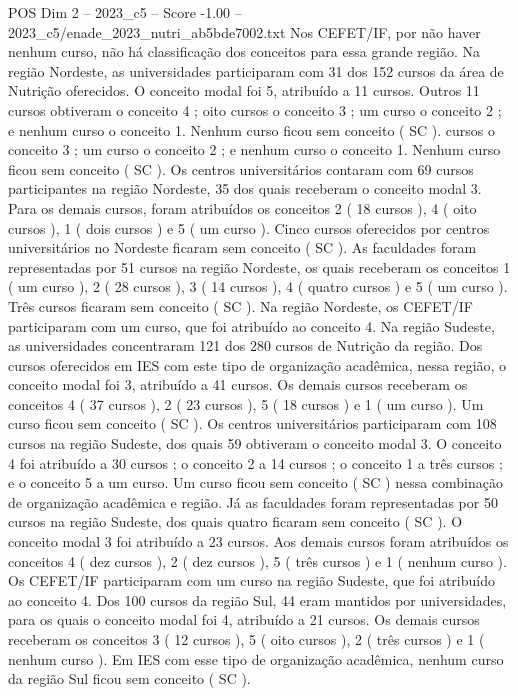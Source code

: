 \begin{textsample}{POS Dim 2 – 2023\_c5 – Score -1.00 – 2023\_c5/enade\_2023\_nutri\_ab5bde7002.txt}
Nos CEFET/IF, por não haver nenhum curso, não há classificação dos conceitos para essa grande região.
Na região Nordeste, as universidades participaram com 31 dos 152 cursos da área de Nutrição oferecidos.
O conceito modal foi 5, atribuído a 11 cursos.
Outros 11 cursos obtiveram o conceito 4 ; oito cursos o conceito 3 ; um curso o conceito 2 ; e nenhum curso o conceito 1.
Nenhum curso ficou sem conceito ( SC ). cursos o conceito 3 ; um curso o conceito 2 ; e nenhum curso o conceito 1.
Nenhum curso ficou sem conceito ( SC ).
Os centros universitários contaram com 69 cursos participantes na região Nordeste, 35 dos quais receberam o conceito modal 3.
Para os demais cursos, foram atribuídos os conceitos 2 ( 18 cursos ), 4 ( oito cursos ), 1 ( dois cursos ) e 5 ( um curso ).
Cinco cursos oferecidos por centros universitários no Nordeste ficaram sem conceito ( SC ).
As faculdades foram representadas por 51 cursos na região Nordeste, os quais receberam os conceitos 1 ( um curso ), 2 ( 28 cursos ), 3 ( 14 cursos ), 4 ( quatro cursos ) e 5 ( um curso ).
Três cursos ficaram sem conceito ( SC ).
Na região Nordeste, os CEFET/IF participaram com um curso, que foi atribuído ao conceito 4.
Na região Sudeste, as universidades concentraram 121 dos 280 cursos de Nutrição da região.
Dos cursos oferecidos em IES com este tipo de organização acadêmica, nessa região, o conceito modal foi 3, atribuído a 41 cursos.
Os demais cursos receberam os conceitos 4 ( 37 cursos ), 2 ( 23 cursos ), 5 ( 18 cursos ) e 1 ( um curso ).
Um curso ficou sem conceito ( SC ).
Os centros universitários participaram com 108 cursos na região Sudeste, dos quais 59 obtiveram o conceito modal 3.
O conceito 4 foi atribuído a 30 cursos ; o conceito 2 a 14 cursos ; o conceito 1 a três cursos ; e o conceito 5 a um curso.
Um curso ficou sem conceito ( SC ) nessa combinação de organização acadêmica e região.
Já as faculdades foram representadas por 50 cursos na região Sudeste, dos quais quatro ficaram sem conceito ( SC ).
O conceito modal 3 foi atribuído a 23 cursos.
Aos demais cursos foram atribuídos os conceitos 4 ( dez cursos ), 2 ( dez cursos ), 5 ( três cursos ) e 1 ( nenhum curso ).
Os CEFET/IF participaram com um curso na região Sudeste, que foi atribuído ao conceito 4.
Dos 100 cursos da região Sul, 44 eram mantidos por universidades, para os quais o conceito modal foi 4, atribuído a 21 cursos.
Os demais cursos receberam os conceitos 3 ( 12 cursos ), 5 ( oito cursos ), 2 ( três cursos ) e 1 ( nenhum curso ).
Em IES com esse tipo de organização acadêmica, nenhum curso da região Sul ficou sem conceito ( SC ).

\end{textsample}
